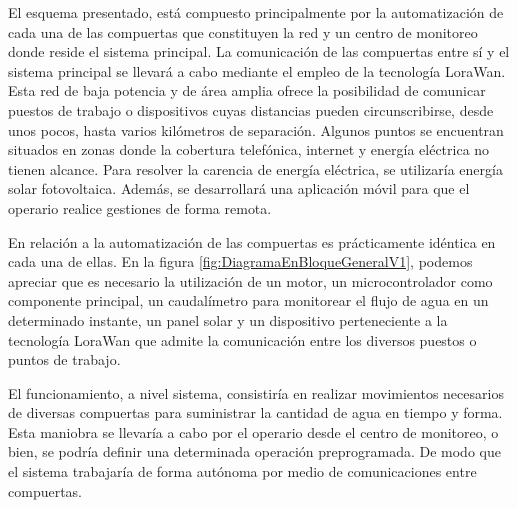 El esquema presentado, está compuesto principalmente por la automatización de cada una de las compuertas que constituyen la red y un centro de monitoreo donde reside el sistema principal. La comunicación de las compuertas entre sí y el sistema principal se llevará a cabo mediante el empleo de la tecnología LoraWan. Esta red de baja potencia y de área amplia ofrece la posibilidad de comunicar puestos de trabajo o dispositivos cuyas distancias pueden circunscribirse, desde unos pocos, hasta varios kilómetros de separación. Algunos puntos se encuentran situados en zonas donde la cobertura telefónica, internet y energía eléctrica no tienen alcance. Para resolver la carencia de energía eléctrica, se utilizaría energía solar fotovoltaica. Además, se desarrollará una aplicación móvil para que el operario realice gestiones de forma remota.

En relación a la automatización de las compuertas es prácticamente idéntica en cada una de ellas. En la figura \ref{fig:DiagramaEnBloqueGeneralV1}, podemos apreciar que es necesario la utilización de un motor, un microcontrolador como componente principal, un caudalímetro  para monitorear el flujo de agua en un determinado instante, un panel solar y un dispositivo perteneciente a la tecnología LoraWan que admite la comunicación entre los diversos puestos o puntos de trabajo.

El funcionamiento, a nivel sistema, consistiría en realizar movimientos necesarios de diversas compuertas para suministrar la cantidad de agua en tiempo y forma. Esta maniobra se llevaría a cabo por el operario desde el centro de monitoreo, o bien, se podría definir una determinada operación preprogramada. De modo que el sistema trabajaría de forma autónoma por medio de comunicaciones entre compuertas.  


